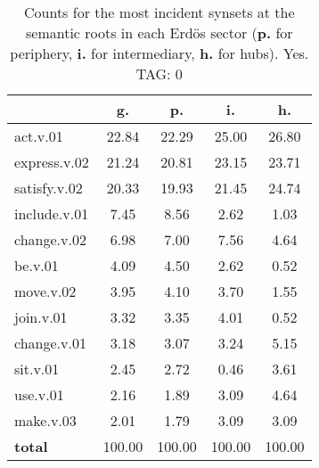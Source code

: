 \begin{table}[h!]
\begin{center}
\begin{tabular}{| l | c | c | c | c |}\hline
 & g. & p. & i. & h. \\\hline
act.v.01 & 22.84  & 22.29  & 25.00  & 26.80 \\\hline
express.v.02 & 21.24  & 20.81  & 23.15  & 23.71 \\\hline
satisfy.v.02 & 20.33  & 19.93  & 21.45  & 24.74 \\\hline
include.v.01 & 7.45  & 8.56  & 2.62  & 1.03 \\\hline
change.v.02 & 6.98  & 7.00  & 7.56  & 4.64 \\\hline
be.v.01 & 4.09  & 4.50  & 2.62  & 0.52 \\\hline
move.v.02 & 3.95  & 4.10  & 3.70  & 1.55 \\\hline
join.v.01 & 3.32  & 3.35  & 4.01  & 0.52 \\\hline
change.v.01 & 3.18  & 3.07  & 3.24  & 5.15 \\\hline
sit.v.01 & 2.45  & 2.72  & 0.46  & 3.61 \\\hline
use.v.01 & 2.16  & 1.89  & 3.09  & 4.64 \\\hline
make.v.03 & 2.01  & 1.79  & 3.09  & 3.09 \\\hline
{{\bf total}} & 100.00  & 100.00  & 100.00  & 100.00 \\\hline
\end{tabular}
\caption{Counts for the most incident synsets at the semantic roots in each Erd\"os sector ({\bf p.} for periphery, {\bf i.} for intermediary, {\bf h.} for hubs). Yes. TAG: 0}
\end{center}
\end{table}
